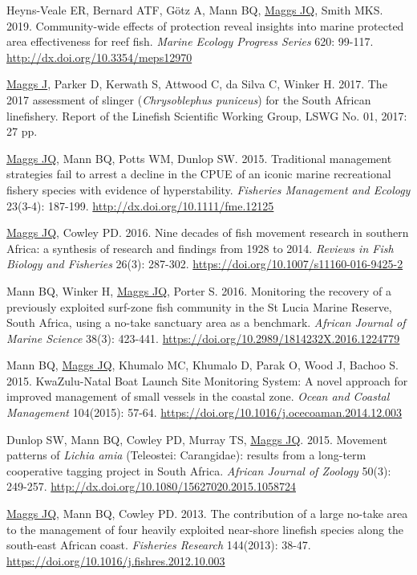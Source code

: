 \documentclass[10pt,a4paper]{article}
\begin{document}
\begin{hangparas}{1.5em}{1}
Heyns-Veale ER, Bernard ATF, G\"otz A, Mann BQ, \underline{Maggs JQ}, Smith MKS. 2019. Community-wide effects of protection reveal insights into marine protected area effectiveness for reef fish. \textit{Marine Ecology Progress Series} 620: 99-117. \url{http://dx.doi.org/10.3354/meps12970}

\underline{Maggs J}, Parker D, Kerwath S, Attwood C, da Silva C, Winker H. 2017. The 2017 assessment of slinger (\textit{Chrysoblephus puniceus}) for the South African linefishery. Report of the Linefish Scientific Working Group, LSWG No. 01, 2017: 27 pp.

\underline{Maggs JQ}, Mann BQ, Potts WM, Dunlop SW. 2015. Traditional management strategies fail to arrest a decline in the CPUE of an iconic marine recreational fishery species with evidence of hyperstability. \textit{Fisheries Management and Ecology} 23(3-4): 187-199. \url{http://dx.doi.org/10.1111/fme.12125}

\underline{Maggs JQ}, Cowley PD. 2016. Nine decades of fish movement research in southern Africa: a synthesis of research and findings from 1928 to 2014. \textit{Reviews in Fish Biology and Fisheries} 26(3): 287-302. \url{https://doi.org/10.1007/s11160-016-9425-2}

Mann BQ, Winker H, \underline{Maggs JQ}, Porter S. 2016. Monitoring the recovery of a previously exploited surf-zone fish community in the St Lucia Marine Reserve, South Africa, using a no-take sanctuary area as a benchmark. \textit{African Journal of Marine Science} 38(3): 423-441. \url{https://doi.org/10.2989/1814232X.2016.1224779}

Mann BQ, \underline{Maggs JQ}, Khumalo MC, Khumalo D, Parak O, Wood J, Bachoo S. 2015. KwaZulu-Natal Boat Launch Site Monitoring System: A novel approach for improved management of small vessels in the coastal zone. \textit{Ocean and Coastal Management} 104(2015): 57-64. \url{https://doi.org/10.1016/j.ocecoaman.2014.12.003}

Dunlop SW, Mann BQ, Cowley PD, Murray TS, \underline{Maggs JQ}. 2015. Movement patterns of \textit{Lichia amia} (Teleostei: Carangidae): results from a long-term cooperative tagging project in South Africa. \textit{African Journal of Zoology} 50(3): 249-257. \url{http://dx.doi.org/10.1080/15627020.2015.1058724}

\underline{Maggs JQ}, Mann BQ, Cowley PD. 2013. The contribution of a large no-take area to the management of four heavily exploited near-shore linefish species along the south-east African coast. \textit{Fisheries Research} 144(2013): 38-47. \url{https://doi.org/10.1016/j.fishres.2012.10.003}


\end{hangparas}
\end{document}
